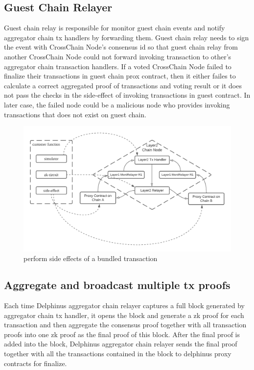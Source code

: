 \documentclass[pageno]{jpaper}
\begin{document}
\subsection{Guest Chain Relayer}
Guest chain relay is responsible for monitor guest chain events and notify aggregator chain tx handlers by forwarding them. Guest chain relay needs to sign the event with CrossChain Node's consensus id so that guest chain relay from another CrossChain Node could not forward invoking transaction to other's aggregator chain transaction handlers. If a voted CrossChain Node failed to finalize their transactions in guest chain prox contract, then it either failes to calculate a correct aggregated proof of transactions and voting result or it does not pass the checks in the side-effect of invoking transactions in guest contract. In later case, the failed node could be a malicious node who provides invoking transactions that does not exist on guest chain.  

\begin{figure}[!ht]
\caption{perform side effects of a bundled transaction}
\label{sideffects}
\includegraphics[scale=0.2]{side-effects}
\end{figure}


\subsection{Aggregate and broadcast multiple tx proofs}
Each time Delphinus aggregator chain relayer captures a full block generated by aggregator chain tx handler, it opens the block and generate a zk proof for each transaction and then aggregate the consensus proof together with all transaction proofs into one zk proof as the final proof of this block. After the final proof is added into the block, Delphinus aggregator chain relayer sends the final proof together with all the transactions contained in the block to delphinus proxy contracts for finalize.
\end{document}
